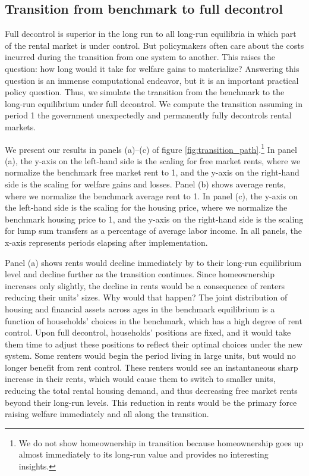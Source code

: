 \documentclass[parskip=full]{article}
\begin{document}
\subsection{Transition from benchmark to full decontrol}\label{subsection:transition}

Full decontrol is superior in the long run to all long-run equilibria in which part of the rental market is under control. But policymakers often care about the costs incurred during the transition from one system to another. This raises the question: how long would it take for welfare gains to materialize? Answering this question is an immense computational endeavor, but it is an important practical policy question. Thus, we simulate the transition from the benchmark to the long-run equilibrium under full decontrol. We compute the transition assuming in period 1 the government unexpectedly and permanently fully decontrols rental markets. 

We present our results in panels (a)--(c) of figure \ref{fig:transition_path}.\footnote{We do not show homeownership in transition because homeownership goes up almost immediately to its long-run value and provides no interesting insights.} In panel (a), the y-axis on the left-hand side is the scaling for free market rents, where we normalize the benchmark free market rent to 1, and the y-axis on the right-hand side is the scaling for welfare gains and losses. Panel (b) shows average rents, where we normalize the benchmark average rent to 1. In panel (c), the y-axis on the left-hand side is the scaling for the housing price, where we normalize the benchmark housing price to 1, and the y-axis on the right-hand side is the scaling for lump sum transfers as a percentage of average labor income. In all panels, the x-axis represents periods elapsing after implementation.

Panel (a) shows rents would decline immediately by to their long-run equilibrium level and decline further as the transition continues. Since homeownership increases only slightly, the decline in rents would be a consequence of renters reducing their units' sizes. Why would that happen? The joint distribution of housing and financial assets across ages in the benchmark equilibrium is a function of households' choices in the benchmark, which has a high degree of rent control. Upon full decontrol, households' positions are fixed, and it would take them time to adjust these positions to reflect their optimal choices under the new system. Some renters would begin the period living in large units, but would no longer benefit from rent control. These renters would see an instantaneous sharp increase in their rents, which would cause them to switch to smaller units, reducing the total rental housing demand, and thus decreasing free market rents beyond their long-run levels. This reduction in rents would be the primary force raising welfare immediately and all along the transition. 
\end{document}
